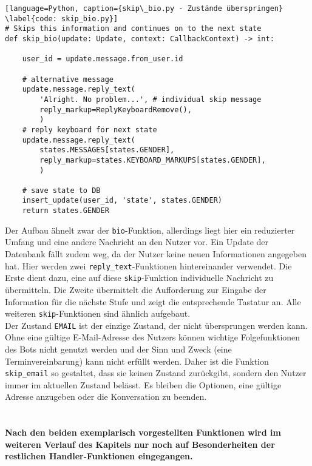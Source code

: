             \begin{lstlisting}[language=Python, caption={skip\_bio.py - Zustände überspringen} \label{code: skip_bio.py}]
# Skips this information and continues on to the next state
def skip_bio(update: Update, context: CallbackContext) -> int:
    
    user_id = update.message.from_user.id

    # alternative message
    update.message.reply_text(
        'Alright. No problem...', # individual skip message
        reply_markup=ReplyKeyboardRemove(),
        )
    # reply keyboard for next state
    update.message.reply_text(
        states.MESSAGES[states.GENDER],
        reply_markup=states.KEYBOARD_MARKUPS[states.GENDER],
        )    

    # save state to DB
    insert_update(user_id, 'state', states.GENDER)
    return states.GENDER
            \end{lstlisting}

                Der Aufbau ähnelt zwar der \verb|bio|-Funktion, allerdings liegt hier ein reduzierter Umfang und eine andere Nachricht an den Nutzer vor. Ein Update der Datenbank fällt zudem weg, da der Nutzer keine neuen Informationen angegeben hat. Hier werden zwei \verb|reply_text|-Funktionen hintereinander verwendet. Die Erste dient dazu, eine auf diese \verb|skip|-Funktion individuelle Nachricht zu übermitteln. Die Zweite  übermittelt die Aufforderung zur Eingabe der Information für die nächste Stufe und zeigt die entsprechende Tastatur an. Alle weiteren \verb|skip|-Funktionen sind ähnlich aufgebaut.\\
                Der Zustand \verb|EMAIL| ist der einzige Zustand, der nicht übersprungen werden kann. Ohne eine gültige E-Mail-Adresse des Nutzers können wichtige Folgefunktionen des Bots nicht genutzt werden und der Sinn und Zweck (eine Terminvereinbarung) kann nicht erfüllt werden. Daher ist die Funktion \verb|skip_email| so gestaltet, dass sie keinen Zustand zurückgibt, sondern den Nutzer immer im aktuellen Zustand belässt. Es bleiben die Optionen, eine gültige Adresse anzugeben oder die Konversation zu beenden.\\ \\

        \paragraph{Nach den beiden exemplarisch vorgestellten Funktionen wird im weiteren Verlauf des Kapitels nur noch auf Besonderheiten der restlichen Handler-Funktionen eingegangen.}

